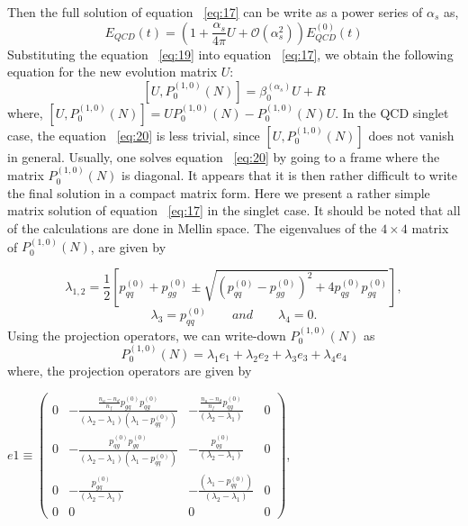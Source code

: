 \documentclass[review]{elsarticle}
\begin{document}
Then the full solution of equation ~\eqref{eq:17}
can be write as a power series of $\alpha_{s}$ as,
\begin{equation}
E_{QCD}(t)=(1+\frac{\alpha_{s}}{4\pi}U+\mathcal{O}(\alpha_{s}^{2}))E_{QCD}^{(0)}(t)\label{eq:19}
\end{equation}
Substituting the equation ~\eqref{eq:19} into equation
~\eqref{eq:17}, we obtain the following equation
for the new evolution matrix $U$:
\begin{equation}
\left[U,P_{0}^{(1,0)}(N)\right]=\beta_{0}^{(\alpha_s)}U+R\label{eq:20}
\end{equation}
where, $\left[U,P_{0}^{(1,0)}(N)\right]=UP_{0}^{(1,0)}(N)-P_{0}^{(1,0)}(N)U$.
In the QCD singlet case, the equation ~\eqref{eq:20}
is less trivial, since $\left[U,P_{0}^{(1,0)}(N)\right]$ does not vanish
in general. Usually, one solves equation ~\eqref{eq:20}
by going to a frame where the matrix $P_{0}^{(1,0)}(N)$ is diagonal.
It appears that it is then rather difficult to write the final solution
in a compact matrix form. Here we present a rather simple matrix solution
of equation ~\eqref{eq:17} in the singlet case.
It should be noted that all of the calculations are done in Mellin space.
The eigenvalues of the $4\times4$ matrix of $P_{0}^{(1,0)}(N)$, are
given by

\[
\lambda_{1,2}=\frac{1}{2}[p_{qq}^{(0)}+p_{gg}^{(0)}\pm\sqrt{(p_{qq}^{(0)}-p_{gg}^{(0)})^{2}+4p_{qg}^{(0)}p_{gq}^{(0)}}],
\]
\[
\lambda_{3}=p_{qq}^{(0)}\qquad and\qquad\lambda_{4}=0.
\]
Using the projection operators, we can write-down $P_{0}^{(1,0)}(N)$
as
\begin{equation}
P_{0}^{(1,0)}(N)=\lambda_{1}e_{1}+\lambda_{2}e_{2}+\lambda_{3}e_{3}+\lambda_{4}e_{4}\label{eq:21}
\end{equation}
where, the projection operators are given by
\begin{center}
$e1\equiv\left(\begin{array}{cccc}
0 & -\frac{\frac{n_{u}-n_{d}}{n_{f}}p_{gq}^{(0)}p_{qg}^{(0)}}{(\lambda_{2}-\lambda_{1})(\lambda_{1}-p_{qq}^{(0)})} & -\frac{\frac{n_{u}-n_{d}}{n_{f}}p_{qg}^{(0)}}{(\lambda_{2}-\lambda_{1})} & 0\\
0 & -\frac{p_{qg}^{(0)}p_{gq}^{(0)}}{(\lambda_{2}-\lambda_{1})(\lambda_{1}-p_{qq}^{(0)})} & -\frac{p_{qg}^{(0)}}{(\lambda_{2}-\lambda_{1})} & 0\\
0 & -\frac{p_{gq}^{(0)}}{(\lambda_{2}-\lambda_{1})} & -\frac{(\lambda_{1}-p_{qq}^{(0)})}{(\lambda_{2}-\lambda_{1})} & 0\\
0 & 0 & 0 & 0
\end{array}\right)$,
\par\end{center}
\end{document}

